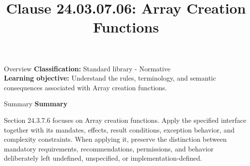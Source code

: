 \documentclass[10pt,letterpaper]{article}
\title{Clause 24.03.07.06: Array Creation Functions}
\author{}
\date{}
\begin{document}
\maketitle
\begin{CornellOverviewBox}{Overview}
\textbf{Classification:} Standard library - Normative\\[2pt]
\textbf{Learning objective:} Understand the rules, terminology, and semantic consequences associated with Array creation functions.
\end{CornellOverviewBox}\begin{CornellSummaryBox}{Summary}
{\sffamily\bfseries\color{Accent} Summary}\par\vspace{3pt}Section 24.3.7.6 focuses on Array creation functions. Apply the specified interface together with its mandates, effects, result conditions, exception behavior, and complexity constraints. When applying it, preserve the distinction between mandatory requirements, recommendations, permissions, and behavior deliberately left undefined, unspecified, or implementation-defined.
\end{CornellSummaryBox}
\end{document}
